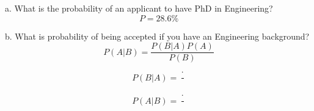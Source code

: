 \documentclass{article}
\begin{document}
a. What is the probability of an applicant to have PhD in Engineering?
\begin{equation}
P = 28.6\%
\end{equation}

b. What is probability of being accepted if you have an Engineering background?
\begin{equation}
P(A|B) = \frac{P(B|A) P(A)}{P(B)}
\end{equation}

\begin{equation}
P(B|A) = \frac{ \cdot }{}
\end{equation}

\begin{equation}
P(A|B) = \frac{ \cdot }{}
\end{equation}
\end{document}
